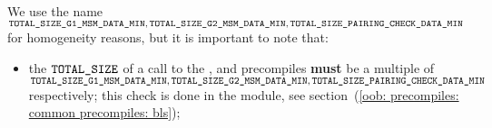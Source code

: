 \saNote{}
We use the name $\texttt{TOTAL\_SIZE\_G1\_MSM\_DATA\_MIN}, \texttt{TOTAL\_SIZE\_G2\_MSM\_DATA\_MIN}, \texttt{TOTAL\_SIZE\_PAIRING\_CHECK\_DATA\_MIN}$ for homogeneity reasons, but it is important to note that:
\begin{itemize}
    \item
        the $\texttt{TOTAL\_SIZE}$ of a call to the ,  and  precompiles \textbf{must} be a multiple of $\texttt{TOTAL\_SIZE\_G1\_MSM\_DATA\_MIN}, \texttt{TOTAL\_SIZE\_G2\_MSM\_DATA\_MIN}, \texttt{TOTAL\_SIZE\_PAIRING\_CHECK\_DATA\_MIN}$ respectively;
        this check is done in the \oobMod{} module, see
        section~(\ref{oob: precompiles: common precompiles: bls}); 
\end{itemize}
